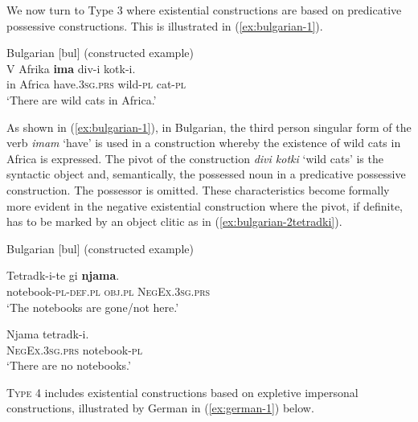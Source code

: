 \documentclass[output=paper,chinesefont,colorlinks,citecolor=brown]{langscibook}
\begin{document}
We now turn to Type 3 where existential constructions are based on predicative possessive constructions. This is illustrated in (\ref{ex:bulgarian-1}).

\begin{exe}
\ex Bulgarian [bul] (constructed example)\label{ex:bulgarian-1}\\
\gll V Afrika \textbf{ima} div-i kotk-i.\\
in Africa have.3\textsc{sg.prs} wild-\textsc{pl} cat-\textsc{pl}\\
\glt `There are wild cats in Africa.'
\end{exe}

As shown in (\ref{ex:bulgarian-1}), in Bulgarian, the third person singular form of the verb \textit{imam} ‘have’ is used in a construction whereby the existence of wild cats in Africa is expressed. The pivot of the construction \textit{divi kotki} ‘wild cats’ is the syntactic object and, semantically, the possessed noun in a predicative possessive construction. The possessor is omitted. These characteristics become formally more evident in the negative existential construction where the pivot, if definite, has to be marked by an object clitic as in (\ref{ex:bulgarian-2tetradki}). 

\begin{exe}
\ex Bulgarian [bul] (constructed example)\label{ex:bulgarian-2}
\begin{xlist}
\ex \label{ex:bulgarian-2tetradki}
\gll Tetradk-i-te gi \textbf{njama}.\\
notebook-\textsc{pl}-\textsc{def.pl} \textsc{obj.pl} \textsc{NegEx.3sg.prs}\\
\glt ‘The notebooks are gone{\slash}not here.’

\ex \label{ex:bulgarian-tetradki-njama}
\gll Njama tetradk-i.\\
\textsc{NegEx.3sg.prs} notebook-\textsc{pl}\\
\glt ‘There are no notebooks.'
\end{xlist}
\end{exe}

\textsc{Type 4} includes existential constructions based on expletive impersonal constructions, illustrated by German in (\ref{ex:german-1}) below.
\end{document}
